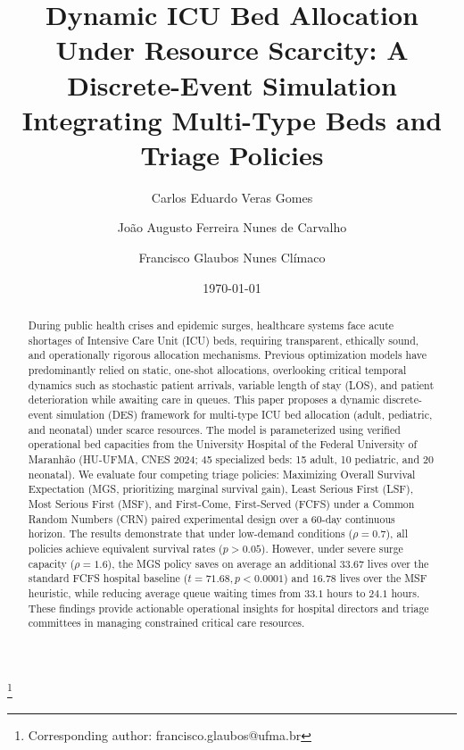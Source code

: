\documentclass{ro}
\begin{document}
\title{Dynamic ICU Bed Allocation Under Resource Scarcity: A Discrete-Event Simulation Integrating Multi-Type Beds and Triage Policies}

\author{Carlos Eduardo Veras Gomes}\address{Universidade Federal do Maranh\~ao, S\~ao Lu\'is, MA, Brazil.}
\author{Jo\~ao Augusto Ferreira Nunes de Carvalho}\address{Universidade Federal do Maranh\~ao, S\~ao Lu\'is, MA, Brazil.}
\author{Francisco Glaubos Nunes Cl\'imaco}\address{Universidade Federal do Maranh\~ao, Av. dos Portugueses, 1966, S\~ao Lu\'is, MA, Brazil.}\thanks{Corresponding author: francisco.glaubos@ufma.br}

\date{\today}

\begin{abstract}
During public health crises and epidemic surges, healthcare systems face acute shortages of Intensive Care Unit (ICU) beds, requiring transparent, ethically sound, and operationally rigorous allocation mechanisms. Previous optimization models have predominantly relied on static, one-shot allocations, overlooking critical temporal dynamics such as stochastic patient arrivals, variable length of stay (LOS), and patient deterioration while awaiting care in queues. This paper proposes a dynamic discrete-event simulation (DES) framework for multi-type ICU bed allocation (adult, pediatric, and neonatal) under scarce resources. The model is parameterized using verified operational bed capacities from the University Hospital of the Federal University of Maranh\~ao (HU-UFMA, CNES 2024; 45 specialized beds: 15 adult, 10 pediatric, and 20 neonatal). We evaluate four competing triage policies: Maximizing Overall Survival Expectation (MGS, prioritizing marginal survival gain), Least Serious First (LSF), Most Serious First (MSF), and First-Come, First-Served (FCFS) under a Common Random Numbers (CRN) paired experimental design over a 60-day continuous horizon. The results demonstrate that under low-demand conditions ($\rho = 0.7$), all policies achieve equivalent survival rates ($p > 0.05$). However, under severe surge capacity ($\rho = 1.6$), the MGS policy saves on average an additional $33.67$ lives over the standard FCFS hospital baseline ($t = 71.68, p < 0.0001$) and $16.78$ lives over the MSF heuristic, while reducing average queue waiting times from $33.1$ hours to $24.1$ hours. These findings provide actionable operational insights for hospital directors and triage committees in managing constrained critical care resources.
\end{abstract}
\end{document}
